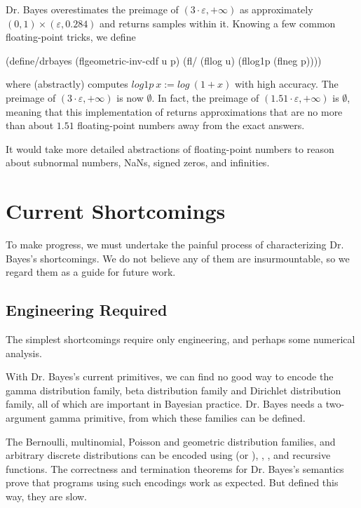 Dr. Bayes overestimates the preimage of $(3 \cdot \varepsilon,+\infty)$ as approximately $(0,1) \times (\varepsilon,0.284)$ and returns samples within it.
Knowing a few common floating-point tricks, we define
\begin{center}\singlespacing
\begin{schemedisplay}
(define/drbayes (flgeometric-inv-cdf u p)
  (fl/ (fllog u) (fllog1p (flneg p))))
\end{schemedisplay}
\end{center}
where  (abstractly) computes $log1p~x := log~(1+x)$ with high accuracy.
The preimage of $(3 \cdot \varepsilon,+\infty)$ is now $\emptyset$.
In fact, the preimage of $(1.51 \cdot \varepsilon,+\infty)$ is $\emptyset$, meaning that this implementation of  returns approximations that are no more than about $1.51$ floating-point numbers away from the exact answers.

It would take more detailed abstractions of floating-point numbers to reason about subnormal numbers, NaNs, signed zeros, and infinities.


\section{Current Shortcomings}

To make progress, we must undertake the painful process of characterizing Dr. Bayes's shortcomings.
We do not believe any of them are insurmountable, so we regard them as a guide for future work.

\subsection{Engineering Required}

The simplest shortcomings require only engineering, and perhaps some numerical analysis.

With Dr. Bayes's current primitives, we can find no good way to encode the gamma distribution family, beta distribution family and Dirichlet distribution family, all of which are important in Bayesian practice.
Dr. Bayes needs a two-argument gamma primitive, from which these families can be defined.

The Bernoulli, multinomial, Poisson and geometric distribution families, and arbitrary discrete distributions can be encoded using  (or ), , \scheme{<}, and recursive functions.
The correctness and termination theorems for Dr. Bayes's semantics prove that programs using such encodings work as expected.
But defined this way, they are slow.

